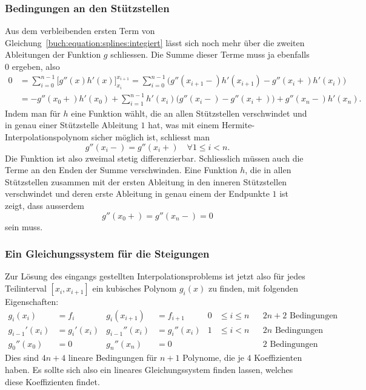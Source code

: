 %
%
\subsubsection{Bedingungen an den Stützstellen}
Aus dem verbleibenden ersten Term von
Gleichung~\eqref{buch:equation:splines:integiert}
lässt sich noch mehr über die zweiten Ableitungen der Funktion $g$
schliessen.
Die Summe dieser Terme muss ja ebenfalls $0$ ergeben, also
\begin{align*}
0
&=
\sum_{i=0}^{n-1} 
\biggl[ g''(x) h'(x) \biggr]_{x_i}^{x_{i+1}}
=
\sum_{i=0}^{n-1}
\bigl( g''(x_{i+1}-) h'(x_{i+1}) - g''(x_i+) h'(x_i) \bigr)
\\
&=
-g''(x_0+)h'(x_0)
+
\sum_{i=1}^{n-1} h'(x_i) \bigl(g''(x_i-) - g''(x_i+)\bigr)
+
g''(x_n-)h'(x_n).
\end{align*}
Indem man für $h$ eine Funktion wählt, die an allen Stützstellen verschwindet
und in genau einer Stützstelle Ableitung $1$ hat, was mit einem
Hermite-Interpolationspolynom sicher möglich ist, schliesst man
\begin{equation}
g''(x_i-)=g''(x_i+)\quad\forall 1\le i< n.
\label{buch:equation:splineinner}
\end{equation}
Die Funktion ist also zweimal stetig differenzierbar.
Schliesslich müssen auch die Terme an den Enden der Summe verschwinden.
Eine Funktion $h$, die in allen Stützstellen zusammen mit der ersten
Ableitung in den inneren Stützstellen verschwindet und deren
erste Ableitung in genau einem der Endpunkte $1$ ist zeigt,
dass ausserdem
\begin{equation}
g''(x_0+) = g''(x_n-) = 0
\label{buch:equation:splinerand}
\end{equation}
sein muss.

%
%
\subsubsection{Ein Gleichungssystem für die Steigungen}
Zur Lösung des eingangs gestellten Interpolationsproblems ist jetzt
also für jedes Teilinterval $[x_i,x_{i+1}]$ ein kubisches Polynom $g_i(x)$
zu finden, mit folgenden Eigenschaften:
\begin{align*}
g_i(x_i)     &=f_i       &g_i(x_{i+1})  &=f_{i+1}   &0&\le i\le n &&\text{$2n+2$ Bedingungen}
\\
g_{i-1}'(x_i)&=g_i'(x_i) &g_{i-1}''(x_i)&=g_i''(x_i)&1&\le i< n &&\text{$2n$ Bedingungen}
\\
g_0''(x_0)   &=0         &g_n''(x_n)    &= 0        & &         &&\text{$2$ Bedingungen}
\end{align*}
Dies sind $4n+4$ lineare Bedingungen für $n+1$ Polynome, die je $4$
Koeffizienten haben.
Es sollte sich also ein lineares Gleichungssystem finden lassen, welches
diese Koeffizienten findet.

